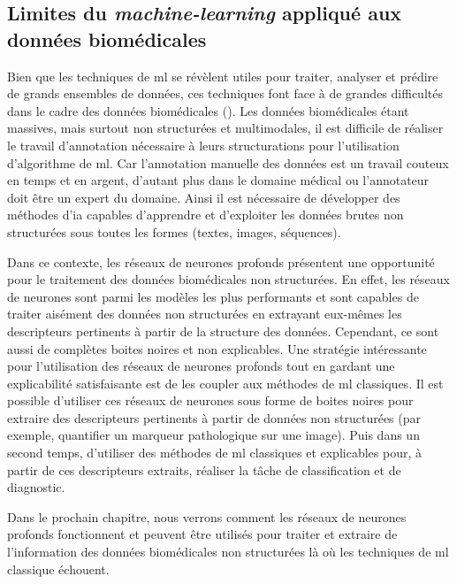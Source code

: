 \subsection{Limites du \textit{machine-learning} appliqué aux données biomédicales}
Bien que les techniques de \gls{ml} se révèlent utiles pour traiter, analyser et prédire de grands ensembles de données, ces techniques font face à de grandes difficultés dans le cadre des données biomédicales (\cite{martinez-garcia_data_2022}). Les données biomédicales étant massives, mais surtout non structurées et multimodales, il est difficile de réaliser le travail d'annotation nécessaire à leurs structurations pour l'utilisation d'algorithme de \gls{ml}. Car l'annotation manuelle des données est un travail couteux en temps et en argent, d'autant plus dans le domaine médical ou l'annotateur doit être un expert du domaine. Ainsi il est nécessaire de développer des méthodes d'\gls{ia} capables d'apprendre et d'exploiter les données brutes non structurées sous toutes les formes (textes, images, séquences).

Dans ce contexte, les réseaux de neurones profonds présentent une opportunité pour le traitement des données biomédicales non structurées. En effet, les réseaux de neurones sont parmi les modèles les plus performants et sont capables de traiter aisément des données non structurées en extrayant eux-mêmes les descripteurs pertinents à partir de la structure des données. Cependant, ce sont aussi de complètes boites noires et non explicables. Une stratégie intéressante pour l'utilisation des réseaux de neurones profonds tout en gardant une explicabilité satisfaisante est de les coupler aux méthodes de \gls{ml} classiques. Il est possible d'utiliser ces réseaux de neurones sous forme de boites noires pour extraire des descripteurs pertinents à partir de données non structurées (par exemple, quantifier un marqueur pathologique sur une image). Puis dans un second temps, d'utiliser des méthodes de \gls{ml} classiques et explicables pour, à partir de ces descripteurs extraits, réaliser la tâche de classification et de diagnostic.

Dans le prochain chapitre, nous verrons comment les réseaux de neurones profonds fonctionnent et peuvent être utilisés pour traiter et extraire de l'information des données biomédicales non structurées là où les techniques de \gls{ml} classique échouent.